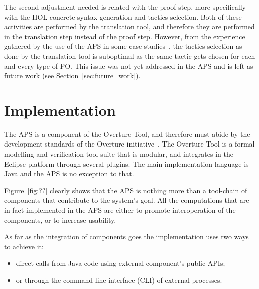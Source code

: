 \documentclass[]{article}
\begin{document}
The second adjustment needed is related with the proof step, more specifically with the HOL concrete syntax generation and tactics selection.
Both of these activities are performed by the translation tool, and therefore they are performed in the translation step instead of the proof step.
However, from the experience gathered by the use of the APS in some case studies~\cite{MiguelMSc,SBMF09paper}, the tactics selection as done by the translation tool is suboptimal as the same tactic gets chosen for each and every type of PO.
This issue was not yet addressed in the APS and is left as future work (see Section~\ref{sec:future_work}).

\section{Implementation}
\label{sec:implementation}

The APS is a component of the Overture Tool, and therefore must abide by the development standards of the Overture initiative~\cite{OverturePaper}.
The Overture Tool is a formal modelling and verification tool suite that is modular, and integrates in the Eclipse platform through several plugins.
The main implementation language is Java and the APS is no exception to that.

Figure~\ref{fig:??} clearly shows that the APS is nothing more than a tool-chain of components that contribute to the system's goal.
All the computations that are in fact implemented in the APS are either to promote interoperation of the components, or to increase usability.

As far as the integration of components goes the implementation uses two ways to achieve it:
\begin{itemize}
  \item direct calls from Java code using external component's public APIs;
  \item or through the command line interface (CLI) of external processes.
\end{itemize}
\end{document}
